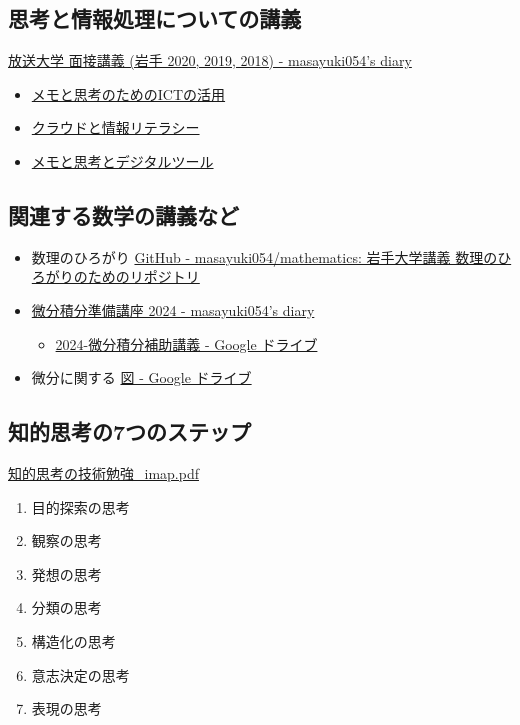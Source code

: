 \documentclass[dvipdfmx,11pat]{jarticle}
\begin{document}
\subsection{思考と情報処理についての講義}
\label{sec:org633edc9}
\href{https://masayuki054.hatenablog.com/entry/2019/12/09/102219}{放送大学 面接講義 (岩手 2020, 2019, 2018) - masayuki054's diary}
\begin{itemize}
\item \href{https://masayuki054.github.io/ict\_literacy\_for\_thinking\_and\_memo/}{メモと思考のためのICTの活用}
\item \href{https://masayuki054.github.io/cloud\_and\_information\_literacy/talk.html}{クラウドと情報リテラシー}
\item \href{https://masayuki054.github.io/tools\_for\_thinking\_and\_memo/talk.html}{メモと思考とデジタルツール}
\end{itemize}
\subsection{関連する数学の講義など}
\label{sec:org01f8230}
\begin{itemize}
\item 数理のひろがり \href{https://github.com/masayuki054/mathematics/tree/main}{GitHub - masayuki054/mathematics: 岩手大学講義 数理のひろがりのためのリポジトリ}
\item \href{https://masayuki054.hatenablog.com/entry/2024/04/09/225336\#orgfce19b2}{微分積分準備講座 2024 - masayuki054's diary}
\begin{itemize}
\item \href{https://drive.google.com/drive/folders/1fYNIqpHaGYXFeuLxqppoT9cEUCEcmbXp}{2024-微分積分補助講義 - Google ドライブ}
\end{itemize}
\item 微分に関する \href{https://drive.google.com/drive/folders/1lY6qb2Z02iAD\_WdesHNMpmsGecY3ynDa}{図 - Google ドライブ}
\end{itemize}
\subsection{知的思考の7つのステップ}
\label{sec:org6ea9e28}
\href{https://masayuki054.github.io/tools\_for\_thinking\_and\_memo/i\_maps/\%E7\%9F\%A5\%E7\%9A\%84\%E6\%80\%9D\%E8\%80\%83\%E3\%81\%AE\%E6\%8A\%80\%E8\%A1\%93\%E5\%8B\%89\%E5\%BC\%B7\_imap.pdf}{知的思考の技術勉強\_imap.pdf}
\begin{enumerate}
\item 目的探索の思考
\item 観察の思考
\item 発想の思考
\item 分類の思考
\item 構造化の思考
\item 意志決定の思考
\item 表現の思考
\end{enumerate}
\end{document}
